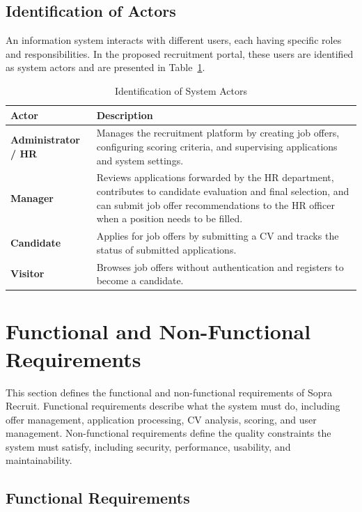 \subsection{Identification of Actors}

An information system interacts with different users, each having specific roles and responsibilities. In the proposed recruitment portal, these users are identified as system actors and are presented in Table~\ref{tab:actors}.

\begin{table}[H]
\centering
\renewcommand{\arraystretch}{1.5}
\begin{tabularx}{\textwidth}{|>{\bfseries\centering\arraybackslash}p{3.5cm}|X|}
\hline
\rowcolor{headerblue}
\textbf{Actor} & \textbf{Description} \\
\hline
Administrator / HR
  & Manages the recruitment platform by creating job offers, configuring scoring criteria, and supervising applications and system settings. \\
\hline
Manager
  & Reviews applications forwarded by the HR department, contributes to candidate evaluation and final selection, and can submit job offer recommendations to the HR officer when a position needs to be filled. \\
\hline
Candidate
  & Applies for job offers by submitting a CV and tracks the status of submitted applications. \\
\hline
Visitor
  & Browses job offers without authentication and registers to become a candidate. \\
\hline
\end{tabularx}
\caption{Identification of System Actors}
\label{tab:actors}
\end{table}

\section{Functional and Non-Functional Requirements}

This section defines the functional and non-functional requirements of Sopra Recruit. Functional requirements describe what the system must do, including offer management, application processing, CV analysis, scoring, and user management. Non-functional requirements define the quality constraints the system must satisfy, including security, performance, usability, and maintainability.

\subsection{Functional Requirements}

